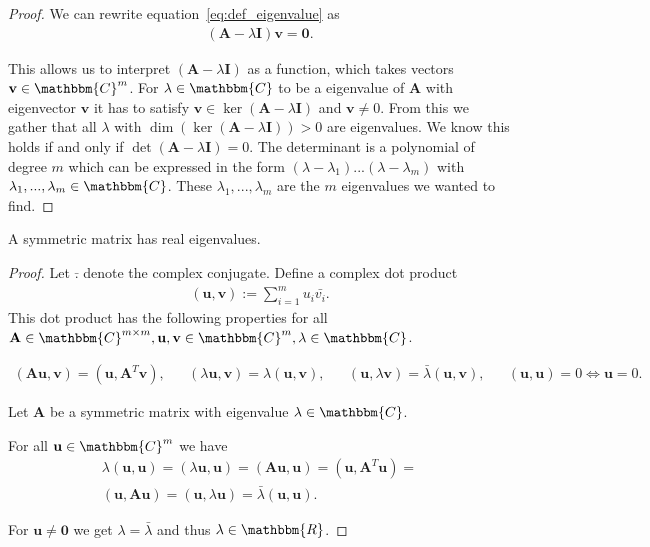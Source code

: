 \begin{proof}
	We can rewrite equation~\ref{eq:def_eigenvalue} as
	\begin{align*}
		(\mathbf{A} - \lambda \mathbf{I})\mathbf{v} = \mathbf{0}.
	\end{align*}
	
	This allows us to interpret $(\mathbf{A}-\lambda \mathbf{I})$ as a function, which takes vectors $\mathbf{v} \in \mathbbm{C}^m$. For $\lambda \in \mathbbm{C}$ to be a eigenvalue of $\mathbf{A}$ with eigenvector $\mathbf{v}$ it has to satisfy $\mathbf{v} \in \ker(\mathbf{A} - \lambda \mathbf{I})$ and $\mathbf{v} \neq 0$. From this we gather that all $\lambda$ with $\dim(\ker(\mathbf{A} - \lambda \mathbf{I})) > 0$ are eigenvalues. We know this holds if and only if $\det(\mathbf{A} - \lambda \mathbf{I}) = 0$. The determinant is a polynomial of degree $m$ which can be expressed in the form $(\lambda - \lambda_1)...(\lambda - \lambda_m)$ with $\lambda_1, ..., \lambda_m \in \mathbbm{C}$. These $\lambda_1, ..., \lambda_m$ are the $m$ eigenvalues we wanted to find.
\end{proof}

\begin{lemma}
	A symmetric matrix has real eigenvalues.
\end{lemma}

\begin{proof}
	Let $\bar{.}$ denote the complex conjugate. Define a complex dot product
	\begin{align*}
		(\mathbf{u}, \mathbf{v}) := \sum_{i=1}^{m} u_i \bar{v_i}.
	\end{align*}
	This dot product has the following properties for all $\mathbf{A} \in \mathbbm{C}^{m\times m}, \mathbf{u}, \mathbf{v} \in \mathbbm{C}^m, \lambda \in \mathbbm{C}$.
	
	\begin{align*}
		(\mathbf{Au}, \mathbf{v}) = (\mathbf{u}, \mathbf{A}^T\mathbf{v}), && (\lambda \mathbf{u}, \mathbf{v}) = \lambda(\mathbf{u}, \mathbf{v}), && (\mathbf{u}, \lambda \mathbf{v}) = \bar{\lambda} (\mathbf{u}, \mathbf{v}), && (\mathbf{u}, \mathbf{u}) = 0 \iff \mathbf{u} = 0.
	\end{align*}
	
	Let $\mathbf{A}$ be a symmetric matrix with eigenvalue $\lambda \in \mathbbm{C}$.
	
	For all $\mathbf{u} \in \mathbbm{C}^m$ we have
	\begin{align*}
		\lambda (\mathbf{u}, \mathbf{u}) = (\lambda \mathbf{u}, \mathbf{u}) = (\mathbf{Au}, \mathbf{u}) = (\mathbf{u}, \mathbf{A}^T\mathbf{u}) =\\
		(\mathbf{u}, \mathbf{Au}) =	(\mathbf{u}, \lambda\mathbf{u}) = \bar{\lambda} (\mathbf{u}, \mathbf{u}).
	\end{align*}
	
	For $\mathbf{u} \neq \mathbf{0}$ we get $\lambda = \bar{\lambda}$ and thus $\lambda \in \mathbbm{R}$.
\end{proof}

